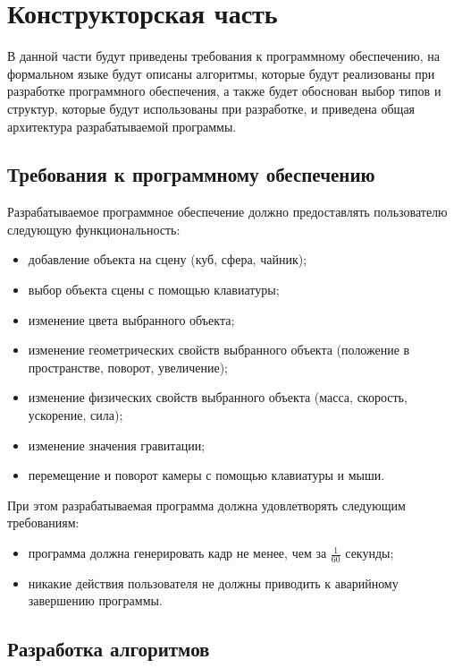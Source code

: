 \section{Конструкторская часть}


В данной части будут приведены требования к программному обеспечению, на формальном языке будут описаны алгоритмы, которые будут реализованы при разработке программного обеспечения, а также будет обоснован выбор типов и структур, которые будут использованы при разработке, и приведена общая архитектура разрабатываемой программы.

\subsection{Требования к программному обеспечению}


Разрабатываемое программное обеспечение должно предоставлять пользователю следующую функциональность:
\begin{itemize}
    \item добавление объекта на сцену (куб, сфера, чайник);
    \item выбор объекта сцены с помощью клавиатуры;
    \item изменение цвета выбранного объекта;
    \item изменение геометрических свойств выбранного объекта (положение в пространстве, поворот, увеличение);
    \item изменение физических свойств выбранного объекта (масса, скорость, ускорение, сила);
    \item изменение значения гравитации;
    \item перемещение и поворот камеры с помощью клавиатуры и мыши.
\end{itemize}

При этом разрабатываемая программа должна удовлетворять следующим требованиям:
\begin{itemize}
    \item программа должна генерировать кадр не менее, чем за $\frac{1}{60}$ секунды;
    \item никакие действия пользователя не должны приводить к аварийному завершению программы.
\end{itemize}

\subsection{Разработка алгоритмов}

